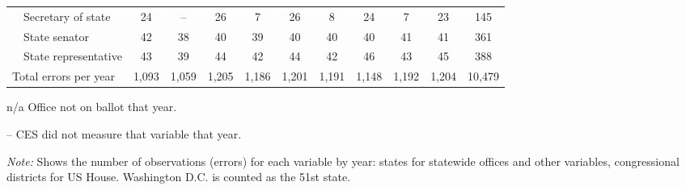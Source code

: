 \begin{table}[!htbp]
{\begin{threeparttable}
\begin{tabular}{lcccccccccc}
~~Secretary of state & 24 & -- & 26 & 7 & 26 & 8 & 24 & 7 & 23 & 145 \\
~~State senator & 42 & 38 & 40 & 39 & 40 & 40 & 40 & 41 & 41 & 361 \\
~~State representative & 43 & 39 & 44 & 42 & 44 & 42 & 46 & 43 & 45 & 388 \\
\midrule
Total errors per year & 1,093 & 1,059 & 1,205 & 1,186 & 1,201 & 1,191 & 1,148 & 1,192 & 1,204 & 10,479 \\
\bottomrule
\end{tabular}
\begin{tablenotes}
\footnotesize
\item n/a Office not on ballot that year.
\item -- CES did not measure that variable that year.
\item \textit{Note:} Shows the number of observations (errors) for each variable by year: states for statewide offices and other variables, congressional districts for US House. Washington D.C. is counted as the 51st state.
\end{tablenotes}
\end{threeparttable}%
}
\end{table}